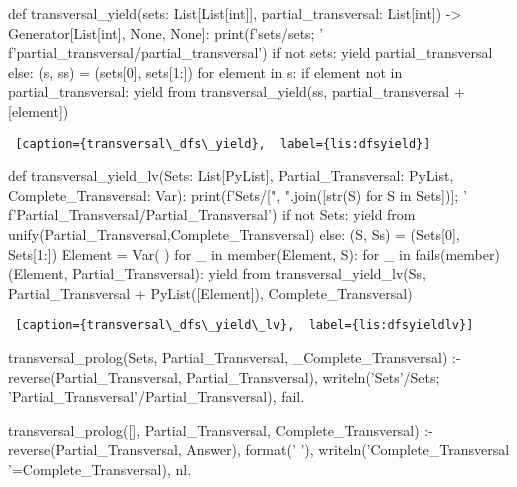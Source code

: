 \begin{center}
\begin{minipage}{\linewidth}
\begin{python}[numbers=left]
def transversal_yield(sets: List[List[int]], 
                      partial_transversal: List[int]) 
                      -> Generator[List[int], None, None]:
  print(f'sets/{sets}; '
        f'partial_transversal/{partial_transversal}')
  if not sets:
    yield partial_transversal
  else:
    (s, ss) = (sets[0], sets[1:])
    for element in s:
      if element not in partial_transversal:
        yield from transversal_yield(ss, partial_transversal + [element])
            
\end{python}
\begin{lstlisting} [caption={transversal\_dfs\_yield},  label={lis:dfsyield}]
\end{lstlisting}
\end{minipage}


\begin{minipage}{\linewidth}
\begin{python}[numbers=left]
def transversal_yield_lv(Sets: List[PyList], 
                         Partial_Transversal: PyList,
                         Complete_Transversal: Var):
  print(f'Sets/[{", ".join([str(S) for S in Sets])}]; '
        f'Partial_Transversal/{Partial_Transversal}')
  if not Sets:
    yield from unify(Partial_Transversal,Complete_Transversal)
  else:
    (S, Ss) = (Sets[0], Sets[1:])
    Element = Var( )
    for _ in member(Element, S):
      for _ in fails(member)(Element, Partial_Transversal):
        yield from 
          transversal_yield_lv(Ss, Partial_Transversal + PyList([Element]), 
                                   Complete_Transversal)
    \end{python}
    \begin{lstlisting} [caption={transversal\_dfs\_yield\_lv},  label={lis:dfsyieldlv}]
    \end{lstlisting}
\end{minipage}


\begin{minipage}{\linewidth}
\begin{python}[numbers=left]
transversal_prolog(Sets, 
                   Partial_Transversal, 
                   _Complete_Transversal) :-
    reverse(Partial_Transversal, Partial_Transversal),
    writeln('Sets'/Sets;
            'Partial_Transversal'/Partial_Transversal), 
    fail.

transversal_prolog([], 
                   Partial_Transversal, 
                   Complete_Transversal) :-
    reverse(Partial_Transversal, Answer),
    format('                                  '),
    writeln('Complete_Transversal '=Complete_Transversal), nl.


\end{python}
\end{minipage}
\end{center}
